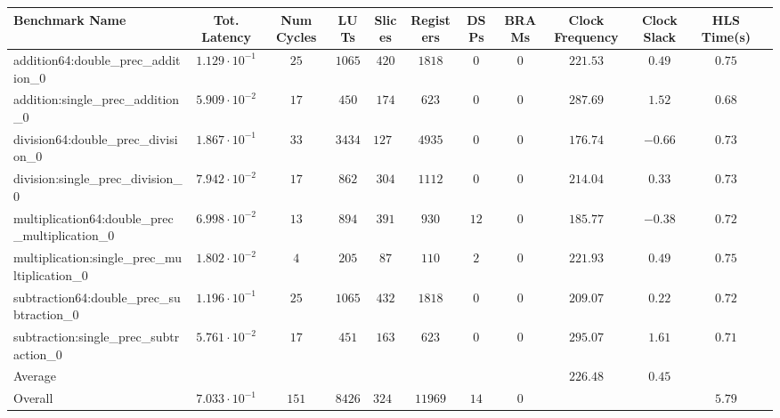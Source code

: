 \begin{tabular}{|l|c|c|c|c|c|c|c|c|c|c|c|}
\hline
Benchmark Name                                   & Tot. Latency            & Num Cycles & LUTs     & Slices   & Registers & DSPs   & BRAMs & Clock Frequency & Clock Slack & HLS Time(s) \\
\hline
addition64:double\_prec\_addition\_0             & $ 1.129 \cdot 10^{-1} $ & $ 25     $ & $ 1065 $ & $ 420  $ & $ 1818  $ & $ 0  $ & $ 0 $ & $ 221.53      $ & $ 0.49    $ & $ 0.75    $ \\
addition:single\_prec\_addition\_0               & $ 5.909 \cdot 10^{-2} $ & $ 17     $ & $ 450  $ & $ 174  $ & $ 623   $ & $ 0  $ & $ 0 $ & $ 287.69      $ & $ 1.52    $ & $ 0.68    $ \\
division64:double\_prec\_division\_0             & $ 1.867 \cdot 10^{-1} $ & $ 33     $ & $ 3434 $ & $ 1276 $ & $ 4935  $ & $ 0  $ & $ 0 $ & $ 176.74      $ & $ -0.66   $ & $ 0.73    $ \\
division:single\_prec\_division\_0               & $ 7.942 \cdot 10^{-2} $ & $ 17     $ & $ 862  $ & $ 304  $ & $ 1112  $ & $ 0  $ & $ 0 $ & $ 214.04      $ & $ 0.33    $ & $ 0.73    $ \\
multiplication64:double\_prec\_multiplication\_0 & $ 6.998 \cdot 10^{-2} $ & $ 13     $ & $ 894  $ & $ 391  $ & $ 930   $ & $ 12 $ & $ 0 $ & $ 185.77      $ & $ -0.38   $ & $ 0.72    $ \\
multiplication:single\_prec\_multiplication\_0   & $ 1.802 \cdot 10^{-2} $ & $ 4      $ & $ 205  $ & $ 87   $ & $ 110   $ & $ 2  $ & $ 0 $ & $ 221.93      $ & $ 0.49    $ & $ 0.75    $ \\
subtraction64:double\_prec\_subtraction\_0       & $ 1.196 \cdot 10^{-1} $ & $ 25     $ & $ 1065 $ & $ 432  $ & $ 1818  $ & $ 0  $ & $ 0 $ & $ 209.07      $ & $ 0.22    $ & $ 0.72    $ \\
subtraction:single\_prec\_subtraction\_0         & $ 5.761 \cdot 10^{-2} $ & $ 17     $ & $ 451  $ & $ 163  $ & $ 623   $ & $ 0  $ & $ 0 $ & $ 295.07      $ & $ 1.61    $ & $ 0.71    $ \\
\hline
Average                                          & $                     $ & $        $ & $      $ & $      $ & $       $ & $    $ & $   $ & $ 226.48      $ & $ 0.45    $ & $         $ \\
\hline
Overall                                          & $ 7.033 \cdot 10^{-1} $ & $ 151    $ & $ 8426 $ & $ 3247 $ & $ 11969 $ & $ 14 $ & $ 0 $ & $             $ & $         $ & $ 5.79    $ \\
\hline
\end{tabular}
